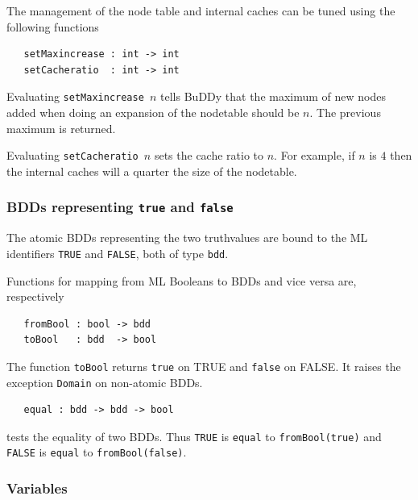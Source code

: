 \documentclass[12pt,fleqn]{book}
\renewcommand{\t}[1]{\mbox{\tt #1}}
\newcommand{\Buddy}{BuDDy{}}
\begin{document}
\medskip

The management of the node table and internal caches can be tuned
using the following functions


\begin{verbatim}
   setMaxincrease : int -> int
   setCacheratio  : int -> int
\end{verbatim}

Evaluating \t{setMaxincrease~$n$} tells \Buddy{} that the maximum of new nodes added
when doing an expansion of the nodetable should be $n$.  The previous maximum is returned.

Evaluating \t{setCacheratio~$n$} sets the cache ratio to $n$.  
For example, if $n$ is $4$ then the internal caches will a quarter the size of the
nodetable.

\subsubsection{BDDs representing {\t{true}} and {\t{false}}}

The atomic BDDs representing the two truthvalues are bound to the ML
identifiers \t{TRUE} and \t{FALSE}, both of type \t{bdd}.

Functions for mapping from ML Booleans to BDDs and vice versa are, respectively

\begin{verbatim}
   fromBool : bool -> bdd
   toBool   : bdd  -> bool
\end{verbatim}

The function \t{toBool} returns \t{true} on TRUE and \t{false} on FALSE.
It raises the exception \t{Domain} on non-atomic BDDs.

\begin{verbatim}
   equal : bdd -> bdd -> bool
\end{verbatim}

tests the equality of two BDDs. Thus \t{TRUE} is \t{equal} to \t{fromBool(true)} and 
\t{FALSE} is \t{equal} to \t{fromBool(false)}.

\subsubsection{Variables}
\end{document}
